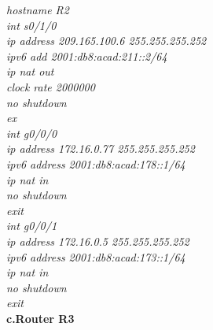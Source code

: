 \documentclass[a4paper, 12pt]{article}
\begin{document}
\hspace*{2cm}\textit{hostname R2\\
\hspace*{2cm}int s0/1/0\\
\hspace*{2cm} ip address 209.165.100.6 255.255.255.252\\
\hspace*{2cm} ipv6 add 2001:db8:acad:211::2/64\\
\hspace*{2cm} ip nat out\\
\hspace*{2cm}clock rate 2000000\\
\hspace*{2cm}no shutdown\\
\hspace*{2cm}ex\\
\hspace*{2cm}int g0/0/0\\
\hspace*{2cm}ip address 172.16.0.77 255.255.255.252\\
\hspace*{2cm}ipv6 address 2001:db8:acad:178::1/64\\
\hspace*{2cm}ip nat in\\
\hspace*{2cm}no shutdown\\
\hspace*{2cm}exit\\
\hspace*{2cm}int g0/0/1\\
\hspace*{2cm}ip address 172.16.0.5 255.255.255.252\\
\hspace*{2cm}ipv6 address 2001:db8:acad:173::1/64\\
\hspace*{2cm}ip nat in\\
\hspace*{2cm}no shutdown\\
\hspace*{2cm}exit\\}
\hspace*{1cm}\textbf{c.Router R3} \\
\end{document}
